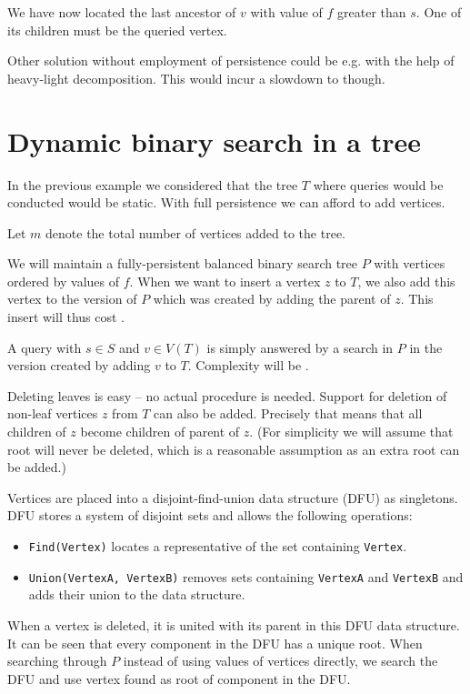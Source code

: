 We have now located the last ancestor of $v$ with value of $f$ greater than $s$. One of its children must be the queried vertex.

Other solution without employment of persistence could be e.g. with the help of heavy-light decomposition. This would incur a slowdown to  though.



\section{Dynamic binary search in a tree}

In the previous example we considered that the tree $T$ where queries would be conducted would be static. With full persistence we can afford to add vertices. %

Let $m$ denote the total number of vertices added to the tree.

We will maintain a fully-persistent balanced binary search tree $P$ with vertices ordered by values of $f$. When we want to insert a vertex $z$ to $T$, we also add this vertex to the version of $P$ which was created by adding the parent of $z$. This insert will thus cost .

A query with $s \in S$ and $v \in V(T)$ is simply answered by a search in $P$ in the version created by adding $v$ to $T$. Complexity will be .

Deleting leaves is easy -- no actual procedure is needed. Support for deletion of non-leaf vertices $z$ from $T$ can also be added. Precisely that means that all children of $z$ become children of parent of $z$. (For simplicity we will assume that root will never be deleted, which is a reasonable assumption as an extra root can be added.) 

Vertices are placed into a disjoint-find-union data structure (DFU) \cite{dfu} as singletons. DFU stores a system of disjoint sets and allows the following operations:

\begin{itemize}
\item {\tt Find(Vertex)} locates a representative of the set containing {\tt Vertex}.
\item {\tt Union(VertexA, VertexB)} removes sets containing {\tt VertexA} and {\tt VertexB} and adds their union to the data structure.
\end{itemize}

When a vertex is deleted, it is united with its parent in this DFU data structure. It can be seen that every component in the DFU has a unique root. When searching through $P$ instead of using values of vertices directly, we search the DFU and use vertex found as root of component in the DFU.


